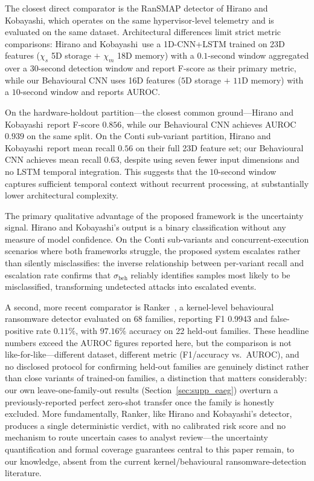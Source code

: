\documentclass[journal]{IEEEtran}
\begin{document}
The closest direct comparator is the RanSMAP detector of Hirano and Kobayashi, which
operates on the same hypervisor-level telemetry and is evaluated on the same
dataset.
Architectural differences limit strict metric comparisons: Hirano and Kobayashi\ use
a 1D-CNN+LSTM trained on 23D features ($\chi_s$ 5D storage $+$ $\chi_m$ 18D
memory) with a $0.1$-second window aggregated over a $30$-second detection
window and report F-score as their primary metric, while our Behavioural CNN
uses 16D features ($5$D storage $+$ $11$D memory) with a $10$-second window
and reports AUROC.

On the hardware-holdout partition---the closest common ground---Hirano and Kobayashi\
report F-score $0.856$, while our Behavioural CNN achieves AUROC $0.939$ on
the same split.
On the Conti sub-variant partition, Hirano and Kobayashi\ report mean recall $0.56$
on their full 23D feature set; our Behavioural CNN achieves mean recall
$0.63$, despite using seven fewer input dimensions and no LSTM temporal
integration.
This suggests that the $10$-second window captures sufficient temporal context
without recurrent processing, at substantially lower architectural complexity.

The primary qualitative advantage of the proposed framework is the uncertainty
signal.
Hirano and Kobayashi's output is a binary classification without any measure of model
confidence.
On the Conti sub-variants and concurrent-execution scenarios where both
frameworks struggle, the proposed system escalates rather than silently
misclassifies: the inverse relationship between per-variant recall and
escalation rate confirms that $\sigma_{\text{beh}}$ reliably identifies samples
most likely to be misclassified, transforming undetected attacks into escalated
events.

A second, more recent comparator is Ranker~\cite{zhang2024ranker}, a
kernel-level behavioural ransomware detector evaluated on 68 families,
reporting F1 $0.9943$ and false-positive rate $0.11\%$, with $97.16\%$
accuracy on 22 held-out families. These headline numbers exceed the AUROC
figures reported here, but the comparison is not like-for-like---different
dataset, different metric (F1/accuracy vs.\ AUROC), and no disclosed
protocol for confirming held-out families are genuinely distinct rather
than close variants of trained-on families, a distinction that matters
considerably: our own leave-one-family-out results
(Section~\ref{sec:supp_eaeg}) overturn a previously-reported perfect
zero-shot transfer once the family is honestly excluded. More
fundamentally, Ranker, like Hirano and Kobayashi's detector, produces a
single deterministic verdict, with no calibrated risk score and no
mechanism to route uncertain cases to analyst review---the uncertainty
quantification and formal coverage guarantees central to this paper
remain, to our knowledge, absent from the current kernel/behavioural
ransomware-detection literature.
\end{document}

